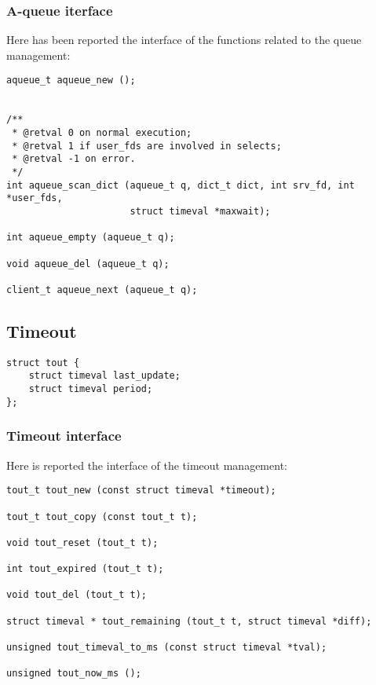 \subsubsection{A-queue iterface}
Here has been reported the interface of the functions related to the queue management:
\begin{lstlisting}
aqueue_t aqueue_new ();


/**                                                                                                        
 * @retval 0 on normal execution;                                                                          
 * @retval 1 if user_fds are involved in selects;                                                          
 * @retval -1 on error.                                                                                    
 */
int aqueue_scan_dict (aqueue_t q, dict_t dict, int srv_fd, int *user_fds,
                      struct timeval *maxwait);

int aqueue_empty (aqueue_t q);

void aqueue_del (aqueue_t q);

client_t aqueue_next (aqueue_t q);
\end{lstlisting}

\subsection{Timeout}

\begin{lstlisting}
struct tout {
    struct timeval last_update;
    struct timeval period;
};
\end{lstlisting}

\subsubsection{Timeout interface}
Here is reported the interface of the timeout management:
\begin{lstlisting}
tout_t tout_new (const struct timeval *timeout);

tout_t tout_copy (const tout_t t);

void tout_reset (tout_t t);

int tout_expired (tout_t t);

void tout_del (tout_t t);

struct timeval * tout_remaining (tout_t t, struct timeval *diff);

unsigned tout_timeval_to_ms (const struct timeval *tval);

unsigned tout_now_ms ();
\end{lstlisting}
